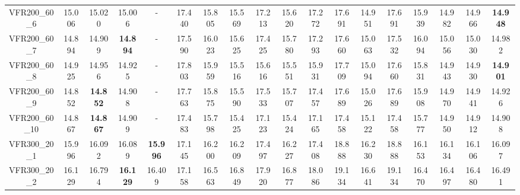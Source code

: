 \begin{tabular}{cc|ccc|ccccccccccccc}
VFR200\_60\_6      & 15.006           & 15.020           & 15.006           & -                & 17.440           & 15.805           & 15.569           & 17.213           & 15.620           & 17.272           & 17.691           & 14.951           & 17.691           & 15.939           & 14.982           & 14.966           & {\bf 14.948}    \\ 
VFR200\_60\_7      & 14.894           & 14.909           & {\bf 14.894}     & -                & 17.590           & 16.023           & 15.625           & 17.425           & 15.780           & 17.293           & 17.660           & 15.063           & 17.532           & 16.094           & 15.056           & 15.030           & 14.982          \\ 
VFR200\_60\_8      & 14.925           & 14.956           & 14.925           & -                & 17.803           & 15.959           & 15.516           & 15.616           & 15.551           & 15.931           & 17.709           & 15.094           & 17.660           & 15.831           & 14.943           & 14.930           & {\bf 14.901}    \\ 
VFR200\_60\_9      & 14.852           & {\bf 14.852}     & 14.908           & -                & 17.763           & 15.875           & 15.590           & 17.533           & 15.707           & 17.457           & 17.689           & 15.026           & 17.689           & 15.908           & 14.970           & 14.941           & 14.926          \\ 
VFR200\_60\_10     & 14.867           & {\bf 14.867}     & 14.909           & -                & 17.483           & 15.798           & 15.425           & 17.123           & 15.424           & 17.165           & 17.458           & 15.122           & 17.458           & 15.777           & 14.950           & 14.912           & 14.908          \\ 
VFR300\_20\_1      & 15.996           & 16.092           & 16.089           & {\bf 15.996}     & 17.145           & 16.200           & 16.209           & 17.497           & 16.227           & 17.408           & 18.888           & 16.230           & 18.888           & 16.153           & 16.134           & 16.106           & 16.097          \\ 
VFR300\_20\_2      & 16.129           & 16.794           & {\bf 16.129}     & 16.409           & 17.158           & 16.563           & 16.849           & 17.920           & 16.877           & 18.086           & 19.134           & 16.641           & 19.134           & 16.470           & 16.497           & 16.480           & 16.491          \\ 

\end{tabular}
